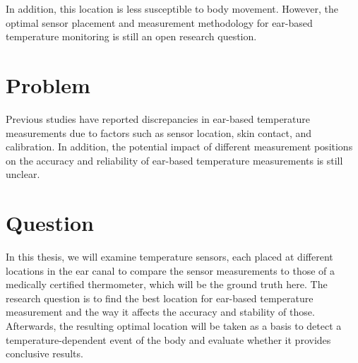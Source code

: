 In addition, this location is less susceptible to body movement. However, the optimal sensor placement and measurement methodology for ear-based temperature monitoring is still an open research question. %


\section{Problem}
Previous studies have reported discrepancies in ear-based temperature measurements due to factors such as sensor location, skin contact, and calibration. In addition, the potential impact of different measurement positions on the accuracy and reliability of ear-based temperature measurements is still unclear.


\section{Question}
In this thesis, we will examine temperature sensors, each placed at different locations in the ear canal to compare the sensor measurements to those of a medically certified thermometer, which will be the ground truth here. The research question is to find the best location for ear-based temperature measurement and the way it affects the accuracy and stability of those. Afterwards, the resulting optimal location will be taken as a basis to detect a temperature-dependent event of the body and evaluate whether it provides conclusive results.


